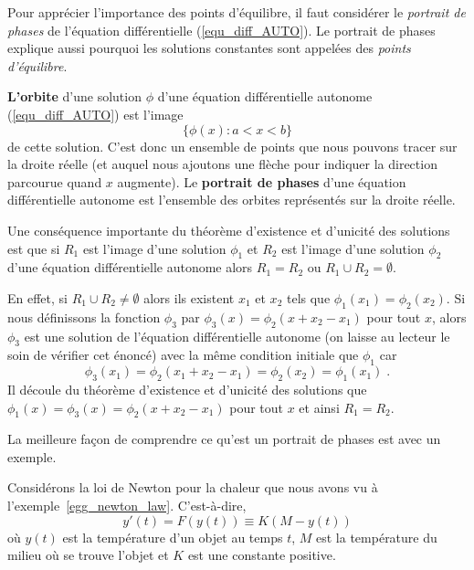 {Pour apprécier l'importance des points d'équilibre, il faut considérer
le {\em portrait de phases} de l'équation différentielle
(\ref{equ_diff_AUTO}).  Le portrait de phases explique aussi pourquoi
les solutions constantes sont appelées des {\em points d'équilibre}.

\begin{defn}
{\bfseries L'orbite} d'une solution $\phi$ d'une équation
différentielle autonome (\ref{equ_diff_AUTO}) est l'image
\[
\{ \phi(x) :  a < x < b \}
\]
de cette solution.  C'est donc un ensemble de points que nous pouvons
tracer sur la droite réelle (et auquel nous ajoutons une flèche pour
indiquer la direction parcourue quand $x$ augmente).
Le {\bfseries portrait de phases} d'une équation différentielle
autonome est l'ensemble des orbites représentés sur la droite
réelle. 
\end{defn}

\begin{rmk}[\theory]
Une conséquence importante du théorème d'existence et d'unicité des
solutions est que si $R_1$ est l'image d'une solution $\phi_1$ et
$R_2$ est l'image d'une solution $\phi_2$ d'une équation
différentielle autonome alors $R_1 = R_2$ ou $R_1 \cup R_2 = \emptyset$. 

En effet, si $R_1 \cup R_2 \neq \emptyset$ alors ils existent $x_1$ et
$x_2$ tels que $\phi_1(x_1) = \phi_2(x_2)$.  Si nous définissons la fonction
$\phi_3$ par $\phi_3(x) = \phi_2(x+x_2-x_1)$ pour tout $x$, alors
$\phi_3$ est une solution de l'équation différentielle autonome (on
laisse au lecteur le soin de vérifier cet énoncé) avec la même
condition initiale que $\phi_1$ car
\[
\phi_3(x_1) = \phi_2(x_1+x_2-x_1) = \phi_2(x_2) = \phi_1(x_1) \; .
\]
Il découle du théorème d'existence et d'unicité des solutions que
$\phi_1(x) = \phi_3(x) = \phi_2(x+x_2-x_1)$ pour tout $x$ et ainsi
$R_1 = R_2$.
\label{dist_img}
\end{rmk}

La meilleure façon de comprendre ce qu'est un portrait de phases est
avec un exemple.

\begin{egg}
Considérons la loi de Newton pour la chaleur que nous avons vu à
l'exemple~\ref{egg_newton_law}.  C'est-à-dire,
\begin{equation}\label{newton2}
y'(t) = F(y(t)) \equiv K ( M - y(t) )
\end{equation}
où $y(t)$ est la température d'un objet au temps $t$, $M$ est la
température du milieu où se trouve l'objet et $K$ est une
constante positive.


\end{egg}}
